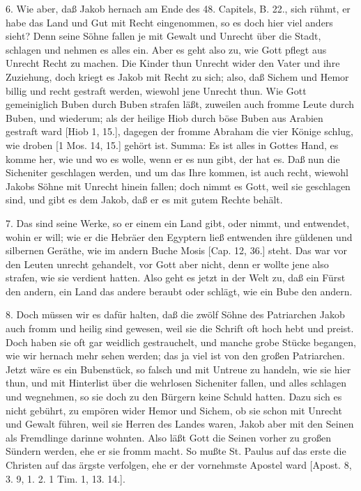 6. Wie aber, daß Jakob hernach am Ende des 48. Capitels, B. 22., sich rühmt, er habe das Land und Gut mit Recht eingenommen, so es doch hier viel anders sieht? Denn seine Söhne fallen je mit Gewalt und Unrecht über die Stadt, schlagen und nehmen es alles ein. Aber es geht also zu, wie Gott pflegt aus Unrecht Recht zu machen. Die Kinder thun Unrecht wider den Vater und ihre Zuziehung, doch kriegt es Jakob mit Recht zu sich; also, daß Sichem und Hemor billig und recht gestraft werden, wiewohl jene Unrecht thun. Wie Gott gemeiniglich Buben durch Buben strafen läßt, zuweilen auch fromme Leute durch Buben, und wiederum; als der heilige Hiob durch böse Buben aus Arabien gestraft ward [Hiob 1, 15.], dagegen der fromme Abraham die vier Könige schlug, wie droben [1 Mos. 14, 15.] gehört ist. Summa: Es ist alles in Gottes Hand, es komme her, wie und wo es wolle, wenn er es nun gibt, der hat es. Daß nun die Sicheniter geschlagen werden, und um das Ihre kommen, ist auch recht, wiewohl Jakobs Söhne mit Unrecht hinein fallen; doch nimmt es Gott, weil sie geschlagen sind, und gibt es dem Jakob, daß er es mit gutem Rechte behält.

7. Das sind seine Werke, so er einem ein Land gibt, oder nimmt, und entwendet, wohin er will; wie er die Hebräer den Egyptern ließ entwenden ihre güldenen und silbernen Geräthe, wie im andern Buche Mosis [Cap. 12, 36.] steht. Das war vor den Leuten unrecht gehandelt, vor Gott aber nicht, denn er wollte jene also strafen, wie sie verdient hatten. Also geht es jetzt in der Welt zu, daß ein Fürst den andern, ein Land das andere beraubt oder schlägt, wie ein Bube den andern.

8. Doch müssen wir es dafür halten, daß die zwölf Söhne des Patriarchen Jakob auch fromm und heilig sind gewesen, weil sie die Schrift oft hoch hebt und preist. Doch haben sie oft gar weidlich gestrauchelt, und manche grobe Stücke begangen, wie wir hernach mehr sehen werden; das ja viel ist von den großen Patriarchen. Jetzt wäre es ein Bubenstück, so falsch und mit Untreue zu handeln, wie sie hier thun, und mit Hinterlist über die wehrlosen Sicheniter fallen, und alles schlagen und wegnehmen, so sie doch zu den Bürgern keine Schuld hatten. Dazu sich es nicht gebührt, zu empören wider Hemor und Sichem, ob sie schon mit Unrecht und Gewalt führen, weil sie Herren des Landes waren, Jakob aber mit den Seinen als Fremdlinge darinne wohnten. Also läßt Gott die Seinen vorher zu großen Sündern werden, ehe er sie fromm macht. So mußte St. Paulus auf das erste die Christen auf das ärgste verfolgen, ehe er der vornehmste Apostel ward [Apost. 8, 3. 9, 1. 2. 1 Tim. 1, 13. 14.].

